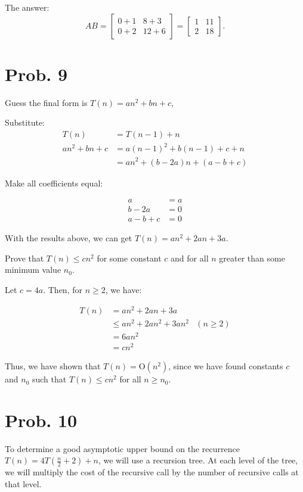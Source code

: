 \documentclass[12pt]{article}
\begin{document}
The answer:
$$
AB = \begin{bmatrix}
0 + 1 & 8 + 3 \\
0 + 2 & 12 + 6
\end{bmatrix} = \begin{bmatrix}
1 & 11 \\
2 & 18
\end{bmatrix}.$$

\section{Prob. 9}

Guess the final form is $T(n) = an^2 + bn + c$,

Substitute:
\begin{align*}
T(n) &= T(n-1) + n \\
an^2 + bn + c &= a(n-1)^2 + b(n-1) + c + n \\
&= an^2 + (b - 2a)n + (a - b + c)
\end{align*}

Make all coefficients equal:

\begin{align*}
a &= a \\
b - 2a &= 0 \\
a - b + c &= 0
\end{align*}

With the results above, we can get $T(n) = an^2 + 2an + 3a$.

Prove that $T(n) \leq cn^2$ for some constant $c$ and for all $n$ greater than some minimum value $n_0$.

Let $c = 4a$. Then, for $n \geq 2$, we have:

\begin{align*}
T(n) &= an^2 + 2an + 3a \\
&\leq an^2 + 2an^2 + 3an^2 &(n \geq 2) \\
&= 6an^2 \\
&= cn^2
\end{align*}

Thus, we have shown that $T(n) = \mathrm{O}(n^2)$, since we have found constants $c$ and $n_0$ such that $T(n) \leq cn^2$ for all $n \geq n_0$.

\section{Prob. 10}

To determine a good asymptotic upper bound on the recurrence $T(n) = 4T(\frac{n}{2} + 2) + n$, we will use a recursion tree. At each level of the tree, we will multiply the cost of the recursive call by the number of recursive calls at that level.
\end{document}

